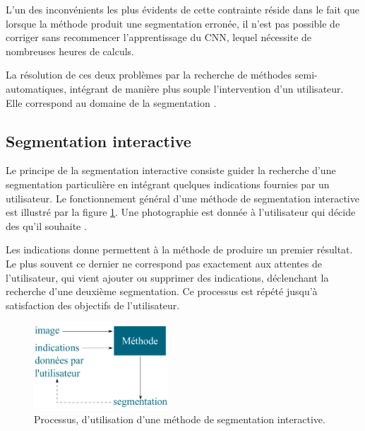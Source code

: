 L'un des inconvénients les plus évidents de cette contrainte réside dans le fait que lorsque la méthode produit une segmentation erronée, il n'est pas possible de  corriger sans recommencer l'apprentissage du CNN, lequel nécessite  de nombreuses heures de calculs.  

La résolution de ces deux problèmes  par la recherche de méthodes semi-au\-to\-ma\-ti\-ques, intégrant de manière plus souple l'intervention d'un utilisateur. Elle correspond au domaine de la segmentation . 

\subsection{Segmentation interactive }

Le principe de la segmentation interactive consiste guider la recherche d'une segmentation particulière en intégrant quelques indications fournies par un utilisateur. Le fonctionnement général d'une méthode de segmentation interactive est illustré par la figure \ref{fig:sota:segInt}. Une photographie est donnée à l'utilisateur qui décide des  qu'il souhaite . 

Les indications  donne permettent à la méthode de produire un premier résultat. Le plus souvent ce dernier ne correspond pas exactement aux attentes de l'utilisateur, qui vient ajouter ou supprimer des indications, déclenchant la recherche d'une deuxième segmentation. Ce processus est répété jusqu'à satisfaction des objectifs de l'utilisateur.

\begin{figure}[htb]
	\centering
		\includegraphics[width=0.45\textwidth]{images/etat-de-l-art/segInt}
		\caption{Processus, d'utilisation d'une méthode de segmentation interactive.}
		 \label{fig:sota:segInt}
\end{figure}


